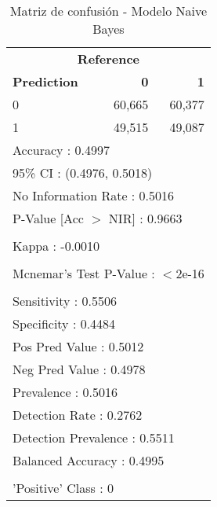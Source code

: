\begin{table}[htbp]
\centering
\caption{Matriz de confusión - Modelo Naive Bayes}
\label{tab:confusion-nb}
\begin{tabular}{lrr}
\toprule
\multicolumn{3}{c}{\textbf{Reference}} \\
\textbf{Prediction} & \textbf{0} & \textbf{1} \\
\midrule
0 & 60,665 & 60,377 \\
1 & 49,515 & 49,087 \\
\midrule
\multicolumn{3}{l}{Accuracy : 0.4997} \\
\multicolumn{3}{l}{95\% CI : (0.4976, 0.5018)} \\
\multicolumn{3}{l}{No Information Rate : 0.5016} \\
\multicolumn{3}{l}{P-Value [Acc $>$ NIR] : 0.9663} \\
\\
\multicolumn{3}{l}{Kappa : -0.0010} \\
\\
\multicolumn{3}{l}{Mcnemar's Test P-Value : $<$2e-16} \\
\\
\multicolumn{3}{l}{Sensitivity : 0.5506} \\
\multicolumn{3}{l}{Specificity : 0.4484} \\
\multicolumn{3}{l}{Pos Pred Value : 0.5012} \\
\multicolumn{3}{l}{Neg Pred Value : 0.4978} \\
\multicolumn{3}{l}{Prevalence : 0.5016} \\
\multicolumn{3}{l}{Detection Rate : 0.2762} \\
\multicolumn{3}{l}{Detection Prevalence : 0.5511} \\
\multicolumn{3}{l}{Balanced Accuracy : 0.4995} \\
\\
\multicolumn{3}{l}{'Positive' Class : 0} \\
\bottomrule
\end{tabular}
\end{table}
